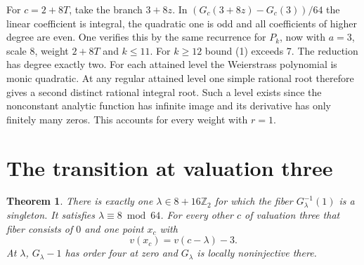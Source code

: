 \documentclass[11pt]{article}
\newtheorem{theorem}{Theorem}
\newcommand{\Z}{\mathbb Z_2}
\begin{document}
For $c=2+8T$, take the branch $3+8z$. In $(G_c(3+8z)-G_c(3))/64$ the linear coefficient is integral, the quadratic one is odd and all coefficients of higher degree are even. One verifies this by the same recurrence for $P_k$, now with $a=3$, scale 8, weight $2+8T$ and $k\le11$. For $k\ge12$ bound (1) exceeds 7. The reduction has degree exactly two. For each attained level the Weierstrass polynomial is monic quadratic. At any regular attained level one simple rational root therefore gives a second distinct rational integral root. Such a level exists since the nonconstant analytic function has infinite image and its derivative has only finitely many zeros. This accounts for every weight with $r=1$.

\section{The transition at valuation three}
\begin{theorem}
There is exactly one $\lambda\in8+16\Z$ for which the fiber $G_\lambda^{-1}(1)$ is a singleton. It satisfies $\lambda\equiv8\bmod64$. For every other $c$ of valuation three that fiber consists of $0$ and one point $x_c$ with
\[
 v(x_c)=v(c-\lambda)-3.
\]
At $\lambda$, $G_\lambda-1$ has order four at zero and $G_\lambda$ is locally noninjective there.
\end{theorem}
\end{document}
